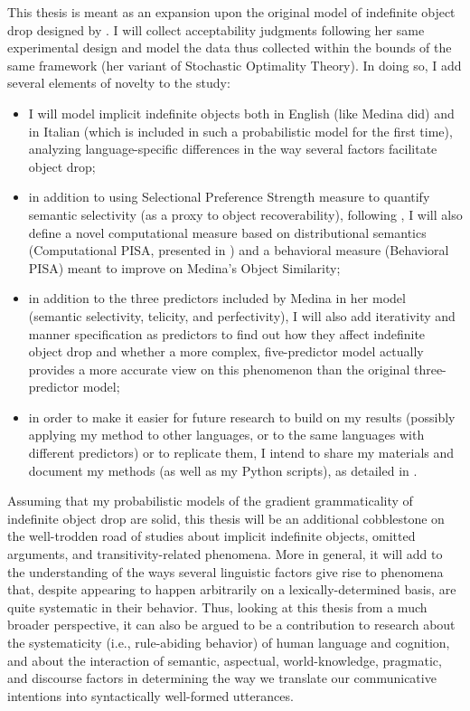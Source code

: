 This thesis is meant as an expansion upon the original model of indefinite object drop designed by \textcite{Medina2007}. I will collect acceptability judgments following her same experimental design and model the data thus collected within the bounds of the same framework (her variant of Stochastic Optimality Theory). In doing so, I add several elements of novelty to the study:
\begin{itemize}
    \item I will model implicit indefinite objects both in English (like Medina did) and in Italian (which is included in such a probabilistic model for the first time), analyzing language-specific differences in the way several factors facilitate object drop;
    \item in addition to using  Selectional Preference Strength measure to quantify semantic selectivity (as a proxy to object recoverability), following \textcite{Medina2007}, I will also define a novel computational measure based on distributional semantics (Computational PISA, presented in \textcite{CappelliLenciPISA}) and a behavioral measure (Behavioral PISA) meant to improve on Medina's Object Similarity;
    \item in addition to the three predictors included by Medina in her model (semantic selectivity, telicity, and perfectivity), I will also add iterativity and manner specification as predictors to find out how they affect indefinite object drop and whether a more complex, five-predictor model actually provides a more accurate view on this phenomenon than the original three-predictor model;
    \item in order to make it easier for future research to build on my results (possibly applying my method to other languages, or to the same languages with different predictors) or to replicate them, I intend to share my materials and document my methods (as well as my Python scripts), as detailed in .
\end{itemize}

Assuming that my probabilistic models of the gradient grammaticality of indefinite object drop are solid, this thesis will be an additional cobblestone on the well-trodden road of studies about implicit indefinite objects, omitted arguments, and transitivity-related phenomena. More in general, it will add to the understanding of the ways several linguistic factors give rise to phenomena that, despite appearing to happen arbitrarily on a lexically-determined basis, are quite systematic in their behavior. Thus, looking at this thesis from a much broader perspective, it can also be argued to be a contribution to research about the systematicity (i.e., rule-abiding behavior) of human language and cognition, and about the interaction of semantic, aspectual, world-knowledge, pragmatic, and discourse factors in determining the way we translate our communicative intentions into syntactically well-formed utterances.

